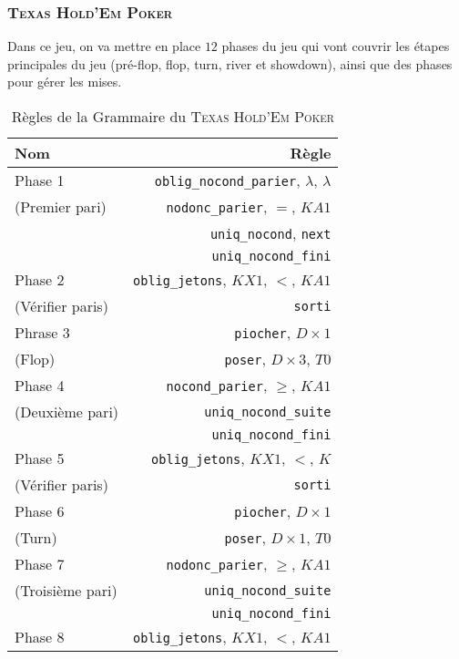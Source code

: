 \documentclass{cours}
\begin{document}
\subsubsection{\textsc{Texas Hold'Em Poker}}
Dans ce jeu, on va mettre en place $12$ phases du jeu qui vont couvrir les étapes principales du jeu (pré-flop, flop, turn, river et showdown), ainsi que des phases pour gérer les mises.
\begin{table}
    \centering
    \caption{Règles de la Grammaire du \textsc{Texas Hold'Em Poker}}
    \label{table:grammar_poker}
    \begin{tabular}{lr}
        \toprule
        Nom & Règle \\
        \midrule
        Phase 1 & \texttt{oblig\_nocond\_parier}, $\lambda$, $\lambda$\\
        (Premier pari) & \texttt{nodonc\_parier}, $=$, $KA1$\\
        & \texttt{uniq\_nocond}, \texttt{next}\\
        & \texttt{uniq\_nocond\_fini}\\
        \midrule
        Phase 2 & \texttt{oblig\_jetons}, $KX1$, $<$, $KA1$\\
        (Vérifier paris) & \texttt{sorti}\\
        \midrule
        Phrase 3 & \texttt{piocher}, $D \times 1$\\
        (Flop) & \texttt{poser}, $D\times 3$, $T0$\\
        \midrule
        Phase 4 & \texttt{nocond\_parier}, $\geq$, $KA1$\\
        (Deuxième pari) & \texttt{uniq\_nocond\_suite}\\
        & \texttt{uniq\_nocond\_fini}\\
        \midrule
        Phase 5 & \texttt{oblig\_jetons}, $KX1$, $<$, $K$\\
        (Vérifier paris) & \texttt{sorti}\\
        \midrule
        Phase 6 & \texttt{piocher}, $D \times 1$\\       
        (Turn) & \texttt{poser}, $D\times 1$, $T0$\\ 
        \midrule
        Phase 7 & \texttt{nodonc\_parier}, $\geq$, $KA1$\\
        (Troisième pari) & \texttt{uniq\_nocond\_suite}\\
        & \texttt{uniq\_nocond\_fini}\\
        \midrule
        Phase 8 & \texttt{oblig\_jetons}, $KX1$, $<$, $KA1$\\

\end{tabular}
\end{table}
\end{document}
